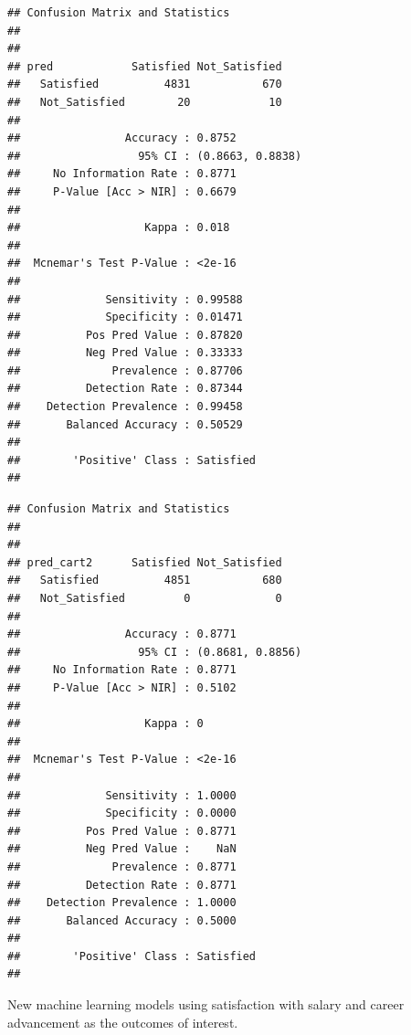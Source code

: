 \documentclass[]{article}
\begin{document}
\begin{verbatim}
## Confusion Matrix and Statistics
## 
##                
## pred            Satisfied Not_Satisfied
##   Satisfied          4831           670
##   Not_Satisfied        20            10
##                                           
##                Accuracy : 0.8752          
##                  95% CI : (0.8663, 0.8838)
##     No Information Rate : 0.8771          
##     P-Value [Acc > NIR] : 0.6679          
##                                           
##                   Kappa : 0.018           
##                                           
##  Mcnemar's Test P-Value : <2e-16          
##                                           
##             Sensitivity : 0.99588         
##             Specificity : 0.01471         
##          Pos Pred Value : 0.87820         
##          Neg Pred Value : 0.33333         
##              Prevalence : 0.87706         
##          Detection Rate : 0.87344         
##    Detection Prevalence : 0.99458         
##       Balanced Accuracy : 0.50529         
##                                           
##        'Positive' Class : Satisfied       
## 
\end{verbatim}

\begin{verbatim}
## Confusion Matrix and Statistics
## 
##                
## pred_cart2      Satisfied Not_Satisfied
##   Satisfied          4851           680
##   Not_Satisfied         0             0
##                                           
##                Accuracy : 0.8771          
##                  95% CI : (0.8681, 0.8856)
##     No Information Rate : 0.8771          
##     P-Value [Acc > NIR] : 0.5102          
##                                           
##                   Kappa : 0               
##                                           
##  Mcnemar's Test P-Value : <2e-16          
##                                           
##             Sensitivity : 1.0000          
##             Specificity : 0.0000          
##          Pos Pred Value : 0.8771          
##          Neg Pred Value :    NaN          
##              Prevalence : 0.8771          
##          Detection Rate : 0.8771          
##    Detection Prevalence : 1.0000          
##       Balanced Accuracy : 0.5000          
##                                           
##        'Positive' Class : Satisfied       
## 
\end{verbatim}

New machine learning models using satisfaction with salary and career
advancement as the outcomes of interest.
\end{document}
